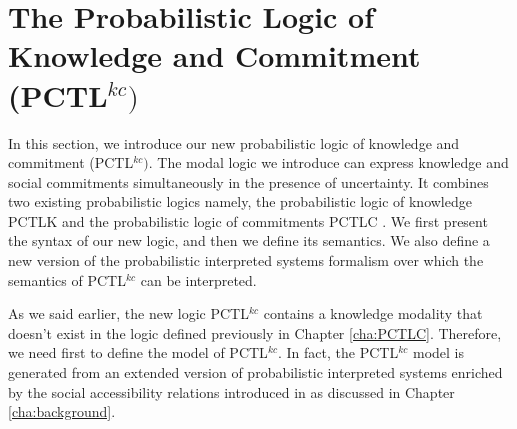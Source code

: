 \section{The Probabilistic Logic of Knowledge and Commitment (PCTL$^{kc})$} \label{sec:PCTLKC-logic}

In this section, we introduce our new probabilistic logic of knowledge and commitment (PCTL$^{kc})$. The modal logic we introduce can express knowledge and social commitments simultaneously in the presence of uncertainty. It combines two existing probabilistic logics namely, the probabilistic logic of knowledge PCTLK \cite{Wan2012,Wan2013} and the probabilistic logic of commitments PCTLC \cite{Sultan2014a,Sultan2013}. We first present the syntax of our new logic, and then we define its semantics. We also define a new version of the probabilistic interpreted systems formalism over which the semantics of PCTL$^{kc}$ can be interpreted.


As we said earlier, the new logic PCTL$^{kc}$ contains a knowledge modality that doesn't exist in the logic defined previously in Chapter \ref{cha:PCTLC}. Therefore, we need first to define the model of PCTL$^{kc}$. In fact, the PCTL$^{kc}$ model is generated from an extended version of probabilistic interpreted systems \cite{Halpern2003,Wan2013} enriched by the social accessibility relations introduced in \cite{Bentahar2012,El-Menshawy2013a} as discussed in Chapter \ref{cha:background}.


